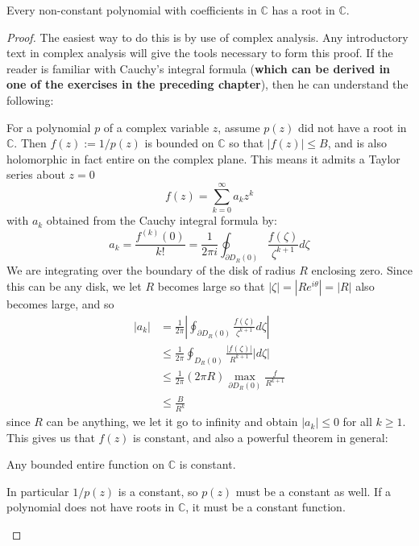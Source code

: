 	 \begin{theorem}
	 	Every non-constant polynomial with coefficients in $\mathbb{C}$ has a root in $\mathbb C$.
	 \end{theorem}
	 \begin{proof}
	 	The easiest way to do this is by use of complex analysis. Any introductory text in complex analysis will give the tools necessary to form this proof. If the reader is familiar with Cauchy's integral formula (\textbf{which can be derived in one of the exercises in the preceding chapter}), then he can understand the following:\\
		
		\begin{small}
		
		For a polynomial $p$ of a complex variable $z$, assume $p(z)$ did not have a root in $\mathbb{C}$. Then $f(z):= 1/p(z)$ is bounded on $\mathbb{C}$ so that $|f(z)|\leq B$, and is also holomorphic in fact entire on the complex plane. This means it admits a Taylor series about $z=0$
		\begin{equation}
			f(z) = \sum_{k=0}^\infty a_k z^k
		\end{equation}
		with $a_k$ obtained from the Cauchy integral formula by:
		\begin{equation}
			a_k = \frac{f^{(k)}(0)}{k!} = \frac{1}{2\pi i} \oint_{\partial D_R(0)} \frac{f(\zeta)}{\zeta^{k+1}} d\zeta
		\end{equation}
		We are integrating over the boundary of the disk of radius $R$ enclosing zero. Since this can be any disk, we let $R$ becomes large so that $|\zeta| = |R e^{i\theta}| = |R|$ also becomes large, and so 
		\begin{align*}
			|a_k| &= \frac{1}{2\pi} \left|\oint_{\partial D_R (0)} \frac{f(\zeta)}{\zeta^{k+1}} d\zeta \right| \\
			&\leq \frac{1}{2\pi} \oint_{D_R(0)} \frac{|f(\zeta)|}{R^{k+1}} |d\zeta|\\
			&\leq \frac{1}{2\pi} (2 \pi R) \max_{\partial D_R (0)} \frac{f}{R^{k+1}}\\
			&\leq \frac{B}{R^k}
		\end{align*}
		since $R$ can be anything, we let it go to infinity and obtain $|a_k| \leq 0$ for all $k \geq 1$. This gives us that $f(z)$ is constant, and also a powerful theorem in general:
		\begin{theorem}[Liouville]
			Any bounded entire function on $\mathbb C$ is constant.
		\end{theorem}
		In particular $1/p(z)$ is a constant, so $p(z)$ must be a constant as well. If a polynomial does not have roots in $\mathbb{C}$, it must be a constant function.
		\end{small}
	 \end{proof}
	 
